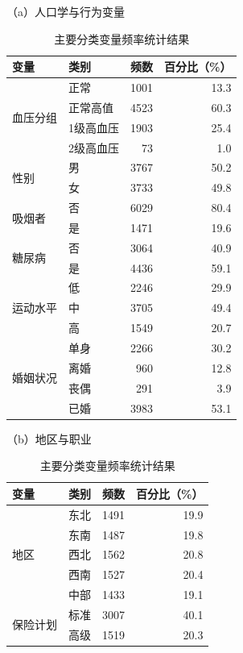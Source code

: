 \documentclass[a4paper]{ctexart}
\begin{document}
\begin{table}[H]
\centering
\caption{主要分类变量频率统计结果}
\label{tab:freq}

\begin{minipage}[t]{0.48\textwidth}
\centering
（a）人口学与行为变量
\medskip
\begin{tabular}{l l r r}
\toprule
变量 & 类别 & 频数 & 百分比（\%） \\
\midrule
\multirow{4}{*}{血压分组} & 正常 & 1001 & 13.3 \\
 & 正常高值 & 4523 & 60.3 \\
 & 1级高血压 & 1903 & 25.4 \\
 & 2级高血压 & 73 & 1.0 \\
\midrule
\multirow{2}{*}{性别} & 男 & 3767 & 50.2 \\
 & 女 & 3733 & 49.8 \\
\midrule
\multirow{2}{*}{吸烟者} & 否 & 6029 & 80.4 \\
 & 是 & 1471 & 19.6 \\
\midrule
\multirow{2}{*}{糖尿病} & 否 & 3064 & 40.9 \\
 & 是 & 4436 & 59.1 \\
\midrule
\multirow{3}{*}{运动水平} & 低 & 2246 & 29.9 \\
 & 中 & 3705 & 49.4 \\
 & 高 & 1549 & 20.7 \\
\midrule
\multirow{4}{*}{婚姻状况} & 单身 & 2266 & 30.2 \\
 & 离婚 & 960 & 12.8 \\
 & 丧偶 & 291 & 3.9 \\
 & 已婚 & 3983 & 53.1 \\
\bottomrule
\end{tabular}
\end{minipage}
\hfill
\begin{minipage}[t]{0.48\textwidth}
\centering
（b）地区与职业
\medskip
\begin{tabular}{l l r r}
\toprule
变量 & 类别 & 频数 & 百分比（\%） \\
\midrule
\multirow{5}{*}{地区} & 东北 & 1491 & 19.9 \\
 & 东南 & 1487 & 19.8 \\
 & 西北 & 1562 & 20.8 \\
 & 西南 & 1527 & 20.4 \\
 & 中部 & 1433 & 19.1 \\
\midrule
\multirow{4}{*}{保险计划} & 标准 & 3007 & 40.1 \\
 & 高级 & 1519 & 20.3 \\

\end{tabular}
\end{minipage}
\end{table}
\end{document}
